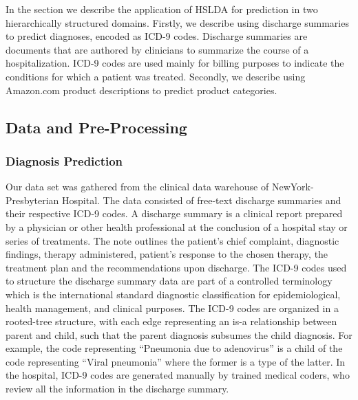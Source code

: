 

In the section we describe the application of HSLDA for prediction
in two hierarchically structured domains. Firstly, we describe using
discharge summaries to predict diagnoses, encoded as ICD-9 codes.
Discharge summaries are documents that are authored by clinicians
to summarize the course of a hospitalization. ICD-9 codes are used
mainly for billing purposes to indicate the conditions for which a
patient was treated. Secondly, we describe using Amazon.com product
descriptions to predict product categories.


\subsection{Data and Pre-Processing}


\subsubsection{Diagnosis Prediction}

Our data set was gathered from the clinical data warehouse of NewYork-Presbyterian
Hospital. The data consisted of free-text discharge summaries and
their respective ICD-9 codes. A discharge summary is a clinical report
prepared by a physician or other health professional at the conclusion
of a hospital stay or series of treatments. The note outlines the
patient's chief complaint, diagnostic findings, therapy administered,
patient's response to the chosen therapy, the treatment plan and the
recommendations upon discharge. The ICD-9 codes used to structure
the discharge summary data are part of a controlled terminology which
is the international standard diagnostic classification for epidemiological,
health management, and clinical purposes. The ICD-9 codes are organized
in a rooted-tree structure, with each edge representing an is-a relationship
between parent and child, such that the parent diagnosis subsumes
the child diagnosis. For example, the code representing {}``Pneumonia
due to adenovirus'' is a child of the code representing {}``Viral
pneumonia'' where the former is a type of the latter. In the hospital,
ICD-9 codes are generated manually by trained medical coders, who
review all the information in the discharge summary.


